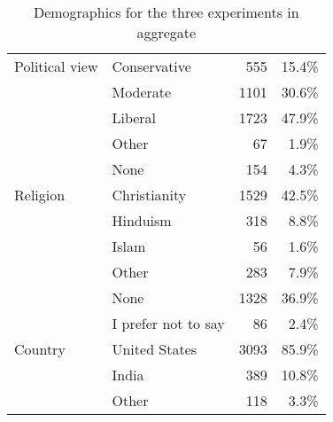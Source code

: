 \begin{table*}[t]
\begin{tabular}{llrr}
  Political view & Conservative & 555 & 15.4\% \\ 
   & Moderate & 1101 & 30.6\% \\ 
   & Liberal & 1723 & 47.9\% \\ 
   & Other &  67 &  1.9\% \\ 
   & None & 154 &  4.3\% \\ 
  Religion & Christianity & 1529 & 42.5\% \\ 
   & Hinduism & 318 &  8.8\% \\ 
   & Islam &  56 &  1.6\% \\ 
   & Other & 283 &  7.9\% \\ 
   & None & 1328 & 36.9\% \\ 
   & I prefer not to say &  86 &  2.4\% \\ 
  Country & United States & 3093 & 85.9\% \\ 
   & India & 389 & 10.8\% \\ 
   & Other & 118 &  3.3\% \\ 
\bottomrule
\end{tabular}
\caption{Demographics for the three experiments in aggregate}
\label{tab:demographics}
\end{table*}
